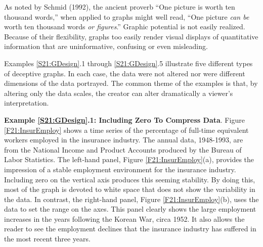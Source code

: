 As noted by Schmid (1992), the ancient proverb ``One picture is
worth ten thousand words,'' when applied to graphs might well read,
``One picture \emph{can be} worth ten thousand words \emph{or
figures}.'' Graphic potential is not easily realized. Because of
their flexibility, graphs too easily render visual displays of
quantitative information that are uninformative, confusing or even
misleading.

Examples \ref{S21:GDesign}.1 through \ref{S21:GDesign}.5 illustrate
five different types of deceptive graphs. In each case, the data
were not altered nor were different dimensions of the data
portrayed. The common theme of the examples is that, by altering
only the data scales, the creator can alter dramatically a viewer's
interpretation.

\linejed

\textbf{Example \ref{S21:GDesign}.1: Including Zero To Compress
Data}. Figure \ref{F21:InsurEmploy} shows a time series of the
percentage of full-time equivalent workers employed in the insurance
industry. The annual data, 1948-1993, are from the National Income
and Product Accounts produced by the Bureau of Labor Statistics. The
left-hand panel, Figure \ref{F21:InsurEmploy}(a), provides the
impression of a stable employment environment for the insurance
industry. Including zero on the vertical axis produces this seeming
stability. By doing this, most of the graph is devoted to white
space that does not show the variability in the data. In contrast,
the right-hand panel, Figure \ref{F21:InsurEmploy}(b), uses the data
to set the range on the axes. This panel clearly shows the large
employment increases in the years following the Korean War, circa
1952. It also allows the reader to see the employment declines that
the insurance industry has suffered in the most recent three years.

